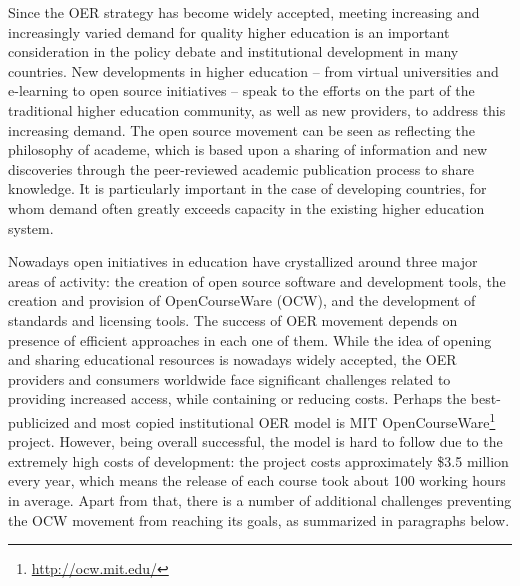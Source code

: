 \documentclass[ngerman,UKenglish,table]{scrbook}
\begin{document}
Since the OER strategy has become widely accepted, meeting increasing and increasingly varied demand for quality higher education is an important consideration in the policy debate and institutional development in many countries.
New developments in higher education – from virtual universities and e-learning to open source initiatives – speak to the efforts on the part of the traditional higher education community, as well as new providers, to address this increasing demand.
The open source movement can be seen as reflecting the philosophy of academe, which is based upon a sharing of information and new discoveries through the peer-reviewed academic publication process to share knowledge.
It is particularly important in the case of developing countries, for whom demand often greatly exceeds capacity in the existing higher education system.

Nowadays open initiatives in education have crystallized around three major areas of activity: the creation of open source software and development tools, the creation and provision of OpenCourseWare (OCW), and the development of standards and licensing tools.
The success of OER movement depends on presence of efficient approaches in each one of them.
While the idea of opening and sharing educational resources is nowadays widely accepted, the OER providers and consumers worldwide face significant challenges related to providing increased access, while containing or reducing costs.
Perhaps the best-publicized and most copied institutional OER model is MIT OpenCourseWare\footnote{\url{http://ocw.mit.edu/}} project.
However, being overall successful, the model is hard to follow due to the extremely high costs of development: the project costs approximately \$3.5 million every year, which means the release of each course took about 100 working hours in average.
Apart from that, there is a number of additional challenges preventing the OCW movement from reaching its goals, as summarized in paragraphs below.
\end{document}

